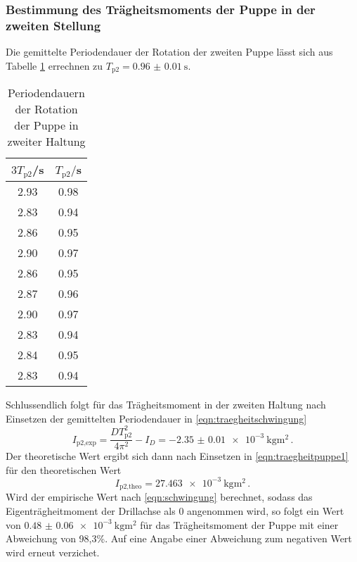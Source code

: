 \subsubsection{Bestimmung des Trägheitsmoments der Puppe in der zweiten Stellung}
Die gemittelte Periodendauer der Rotation der zweiten Puppe lässt sich aus Tabelle
\ref{tab:puppe2} errechnen zu $T_{\text{p2}}=\SI{0.96(001)}{\second}$.
\begin{table}[H]
\centering
\caption{Periodendauern der Rotation der Puppe in zweiter Haltung}
\label{tab:puppe2}
\begin{tabular}{c c}
\toprule
$3T_{\text{p2}}$/s & $T_{\text{p2}}/$s \\
\midrule
2.93 & 0.98 \\
2.83 & 0.94 \\
2.86 & 0.95 \\
2.90 & 0.97 \\
2.86 & 0.95 \\
2.87 & 0.96 \\
2.90 & 0.97 \\
2.83 & 0.94 \\
2.84 & 0.95 \\
2.83 & 0.94 \\
\bottomrule
\end{tabular}
\end{table}
Schlussendlich folgt für das Trägheitsmoment in der zweiten Haltung nach Einsetzen
der gemittelten Periodendauer in \eqref{eqn:traegheitschwingung}
\begin{equation}
  I_{\text{p2,exp}} = \frac{DT_{\text{p2}}^2}{4\pi^2}-I_D = \SI{-2.35(001)e-3}{\kilogram\meter\squared}\,.
\end{equation}
Der theoretische Wert ergibt sich dann nach Einsetzen in
\eqref{eqn:traegheitpuppe1} für den theoretischen Wert
\begin{equation}
  I_{\text{p2,theo}} = \SI{27.463e-3}{\kilogram\meter\squared}\,.
\end{equation}
Wird der empirische Wert nach \eqref{eqn:schwingung} berechnet, sodass das
Eigenträgheitmoment der Drillachse als 0 angenommen wird, so folgt ein Wert
von $\SI{0.48(006)e-3}{\kilogram\meter\squared}$ für das Trägheitsmoment der
Puppe mit einer Abweichung von 98,3\%.
Auf eine Angabe einer Abweichung zum negativen Wert wird erneut verzichet.
